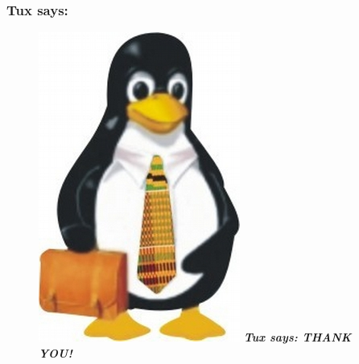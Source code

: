 \documentclass{beamer}
\begin{document}
		\begin{frame} \frametitle{Tux says:}
			\begin{figure}
			\includegraphics[width = 0.3\linewidth]{ghTux.jpg}
			\textbf{\textit{{\large Tux says:} {\Huge THANK YOU!}}}
			\end{figure}	
		\end{frame}


	
	
\end{document}
